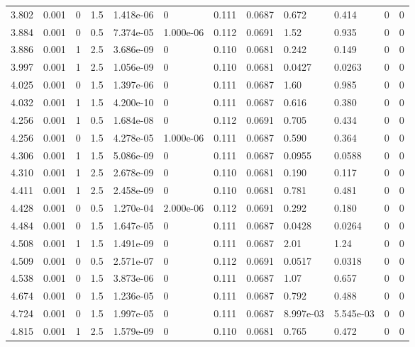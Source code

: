 \documentclass[preview]{standalone}
\begin{document}
{{{\begin{tabular}{L{1.2cm}C{1.2cm} C{0.3cm}C{0.5cm} C{1.4cm}C{1.4cm} C{1.4cm}C{1.4cm} C{1.6cm}C{1.6cm} C{1.6cm}C{1.6cm}}
  3.802  &  0.001  & 0     & 1.5 &  1.418e-06  & 0  &  0.111&   0.0687& 0.672 & 0.414   &  0 & 0  \\ 
  3.884  &  0.001  & 0     & 0.5 &  7.374e-05  & 1.000e-06  &  0.112&   0.0691& 1.52 & 0.935   &  0 & 0  \\ 
  3.886  &  0.001  & 1     & 2.5 &  3.686e-09  & 0  &  0.110&   0.0681& 0.242 & 0.149   &  0 & 0  \\ 
  3.997  &  0.001  & 1     & 2.5 &  1.056e-09  & 0  &  0.110&   0.0681& 0.0427 & 0.0263   &  0 & 0  \\ 
  4.025  &  0.001  & 0     & 1.5 &  1.397e-06  & 0  &  0.111&   0.0687& 1.60 & 0.985   &  0 & 0  \\ 
  4.032  &  0.001  & 1     & 1.5 &  4.200e-10  & 0  &  0.111&   0.0687& 0.616 & 0.380   &  0 & 0  \\ 
  4.256  &  0.001  & 1     & 0.5 &  1.684e-08  & 0  &  0.112&   0.0691& 0.705 & 0.434   &  0 & 0  \\ 
  4.256  &  0.001  & 0     & 1.5 &  4.278e-05  & 1.000e-06  &  0.111&   0.0687& 0.590 & 0.364   &  0 & 0  \\ 
  4.306  &  0.001  & 1     & 1.5 &  5.086e-09  & 0  &  0.111&   0.0687& 0.0955 & 0.0588   &  0 & 0  \\ 
  4.310  &  0.001  & 1     & 2.5 &  2.678e-09  & 0  &  0.110&   0.0681& 0.190 & 0.117   &  0 & 0  \\ 
  4.411  &  0.001  & 1     & 2.5 &  2.458e-09  & 0  &  0.110&   0.0681& 0.781 & 0.481   &  0 & 0  \\ 
  4.428  &  0.001  & 0     & 0.5 &  1.270e-04  & 2.000e-06  &  0.112&   0.0691& 0.292 & 0.180   &  0 & 0  \\ 
  4.484  &  0.001  & 0     & 1.5 &  1.647e-05  & 0  &  0.111&   0.0687& 0.0428 & 0.0264   &  0 & 0  \\ 
  4.508  &  0.001  & 1     & 1.5 &  1.491e-09  & 0  &  0.111&   0.0687& 2.01 & 1.24   &  0 & 0  \\ 
  4.509  &  0.001  & 0     & 0.5 &  2.571e-07  & 0  &  0.112&   0.0691& 0.0517 & 0.0318   &  0 & 0  \\ 
  4.538  &  0.001  & 0     & 1.5 &  3.873e-06  & 0  &  0.111&   0.0687& 1.07 & 0.657   &  0 & 0  \\ 
  4.674  &  0.001  & 0     & 1.5 &  1.236e-05  & 0  &  0.111&   0.0687& 0.792 & 0.488   &  0 & 0  \\ 
  4.724  &  0.001  & 0     & 1.5 &  1.997e-05  & 0  &  0.111&   0.0687& 8.997e-03 & 5.545e-03   &  0 & 0  \\ 
  4.815  &  0.001  & 1     & 2.5 &  1.579e-09  & 0  &  0.110&   0.0681& 0.765 & 0.472   &  0 & 0  \\ 

\end{tabular}}}}
\end{document}
